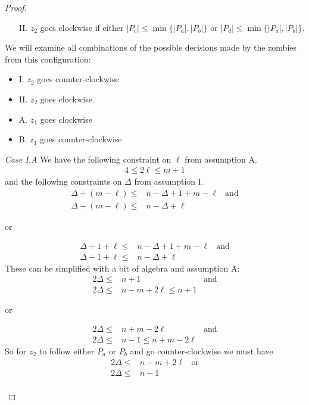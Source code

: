 \begin{proof}
\begin{proofpart}
\begin{itemize}
   \item[II.] $z_2$ goes clockwise if either $|P_c| \leq \min \{ |P_a|, |P_b| \}$ or $|P_d| \leq \min \{ |P_a|, |P_b| \}$.
  \end{itemize}

  We will examine all combinations of the possible decisions
  made by the zombies from this configuration:

  \begin{itemize}
   \item I. $z_2$ goes counter-clockwise
   \item II. $z_2$ goes clockwise.
   \item A. $z_1$ goes clockwise
   \item B. $z_1$ goes counter-clockwise
  \end{itemize}

  \textit{Case I.A} We have the following constraint on $\ell$ from
  assumption A.
  \begin{align*}
   4 \leq 2 \ell \leq m + 1
  \end{align*}
  and the following constraints on $\Delta$ from assumption I.
  \begin{align*}
   \Delta + (m - \ell) \leq & n - \Delta + 1 + m - \ell & \text{and} \\
   \Delta + (m - \ell) \leq & n - \Delta + \ell
  \end{align*}
  \begin{center}or\end{center}
  \begin{align*}
   \Delta + 1 + \ell \leq & n - \Delta + 1 + m - \ell & \text{and} \\
   \Delta + 1 + \ell \leq & n - \Delta + \ell
  \end{align*}
  These can be simplified with a bit of algebra and assumption A:
  \begin{align*}
   2 \Delta \leq & n+1                    & \text{and} \\
   2 \Delta \leq & n - m + 2\ell \leq n+1
  \end{align*}
  \begin{center}or\end{center}
  \begin{align*}
   2 \Delta \leq & n+m -2 \ell             & \text{and} \\
   2 \Delta \leq & n -1 \leq n + m - 2\ell
  \end{align*}
  So for $z_2$ to follow either $P_a$ or $P_b$ and go counter-clockwise we must have
  \begin{align*}
   2 \Delta \leq & n - m + 2\ell & \text{or} \\
   2 \Delta \leq & n - 1                     \\
  \end{align*}


\end{proofpart}
\end{proof}
